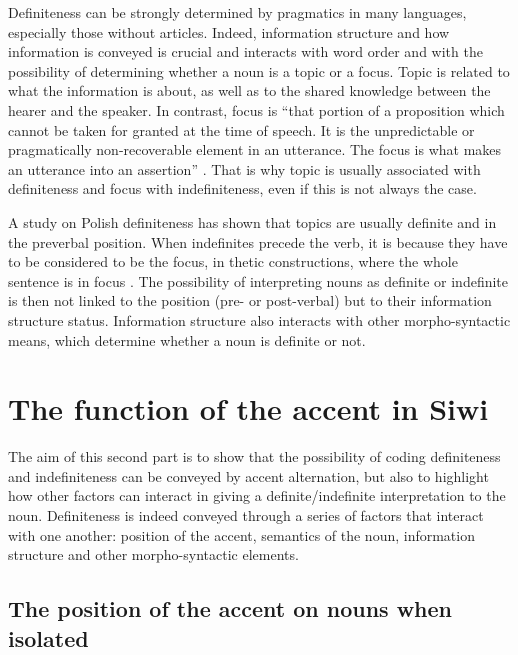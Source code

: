 \documentclass[output=paper]{langsci/langscibook}
\begin{document}
{
Definiteness can be strongly determined by pragmatics in many languages, especially those without articles. Indeed, information structure and how information is conveyed is crucial and interacts with word order and with the possibility of determining whether a noun is a topic or a focus. Topic is related to what the information is about, as well as to the shared knowledge between the hearer and the speaker.  In contrast, focus is ``that portion of a proposition which cannot be taken for granted at the time of speech. It is the unpredictable or pragmatically non-recoverable element in an utterance. The focus is what makes an utterance into an assertion'' \citep[][207]{lambrecht:94}. That is why topic is usually associated with definiteness and focus with indefiniteness, even if this is not always the case.
}

A study on Polish definiteness \citep{czardybon:17} has shown that topics are usually definite and in the preverbal position. When indefinites precede the verb, it is because they have to be considered to be the focus, in thetic constructions, where the whole sentence is in focus \citep[][144]{lambrecht:94}. The possibility of interpreting nouns as definite or indefinite is then not linked to the position (pre- or post-verbal) but to their information structure status. Information structure also interacts with other morpho-syntactic means, which determine whether a noun is definite or not. 


\section{The function of the accent in Siwi}\label{5sec:2}

The aim of this second part is to show that the possibility of coding definiteness and indefiniteness can be conveyed by accent alternation, but also to highlight how other factors can interact in giving a definite/indefinite interpretation to the noun. Definiteness is indeed conveyed through a series of factors that interact with one another: position of the accent, semantics of the noun, information structure and other morpho-syntactic elements.


\subsection{The position of the accent on nouns when isolated}\label{5sec:21}
\end{document}
